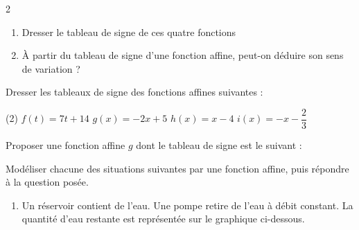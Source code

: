 \documentclass[10pt,a4paper]{article}
\begin{document}
\begin{multicols}{2}
\begin{exo}
\begin{enumerate}
    \item Dresser le tableau de signe de ces quatre fonctions
    \item À partir du tableau de signe d'une fonction affine, peut-on déduire son sens de variation ?
\end{enumerate}
\end{exo}

\begin{exo}[][]
    Dresser les tableaux de signe des fonctions affines suivantes :
    \begin{tasks}(2)
        \task \(f(t) = 7t+14\)
        \task \(g(x) = -2x+5\)
        \task \(h(x) = x-4\)
        \task \(i(x) = -x-\dfrac{2}{3}\)
    \end{tasks}
\end{exo}

\begin{exo}[][]
    Proposer une fonction affine \(g\) dont le tableau de signe est le suivant :
\end{exo}



\begin{exo}[][]
    Modéliser chacune des situations suivantes par une fonction affine, puis répondre à la question posée.
    \begin{enumerate}
        \item Un réservoir contient de l'eau. Une pompe retire de l'eau à débit constant. La quantité d'eau restante est représentée sur le graphique ci-dessous.


\end{enumerate}
\end{exo}
\end{multicols}
\end{document}
